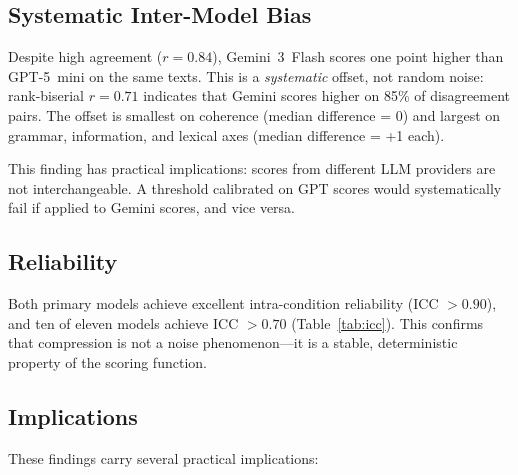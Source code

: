 \documentclass[11pt]{article}
\begin{document}
\subsection{Systematic Inter-Model Bias}

Despite high agreement ($r = 0.84$), Gemini~3~Flash scores one point higher than GPT-5~mini on the same texts. This is a \emph{systematic} offset, not random noise: rank-biserial $r = 0.71$ indicates that Gemini scores higher on 85\% of disagreement pairs. The offset is smallest on coherence (median difference = 0) and largest on grammar, information, and lexical axes (median difference = +1 each).

This finding has practical implications: scores from different LLM providers are not interchangeable. A threshold calibrated on GPT scores would systematically fail if applied to Gemini scores, and vice versa.

\subsection{Reliability}

Both primary models achieve excellent intra-condition reliability (ICC $> 0.90$), and ten of eleven models achieve ICC $> 0.70$ (Table~\ref{tab:icc}). This confirms that compression is not a noise phenomenon---it is a stable, deterministic property of the scoring function.

\subsection{Implications}

These findings carry several practical implications:
\end{document}
